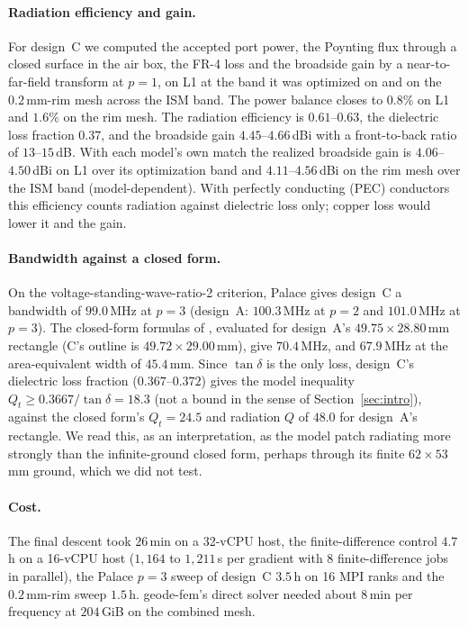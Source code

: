 \documentclass{anvil-paper}
\begin{document}
\paragraph{Radiation efficiency and gain.}
For design~C we computed the accepted port power, the Poynting flux through
a closed surface in the air box, the FR-4 loss and the broadside gain by a
near-to-far-field transform at $p = 1$, on L1 at the band it was optimized
on and on the $0.2$\,mm-rim mesh across the ISM band. The power balance
closes to $0.8\%$ on L1 and $1.6\%$ on the rim mesh. The radiation
efficiency is $0.61$--$0.63$, the dielectric loss fraction $0.37$, and the
broadside gain $4.45$--$4.66$\,dBi with a front-to-back ratio of
$13$--$15$\,dB. With each model's own match the realized broadside gain is
$4.06$--$4.50$\,dBi on L1 over its optimization band and $4.11$--$4.56$\,dBi
on the rim mesh over the ISM band (model-dependent). With perfectly
conducting (PEC) conductors this efficiency counts radiation against dielectric loss only;
copper loss would lower it and the gain.

\paragraph{Bandwidth against a closed form.}
On the voltage-standing-wave-ratio-2 criterion, Palace gives design~C a
bandwidth of $99.0$\,MHz at $p = 3$ (design~A: $100.3$\,MHz at $p = 2$ and
$101.0$\,MHz at $p = 3$). The closed-form formulas of
\citet{jackson1991simple}, evaluated for design~A's $49.75\times28.80$\,mm
rectangle (C's outline is $49.72\times29.00$\,mm), give $70.4$\,MHz, and
$67.9$\,MHz at the area-equivalent width of $45.4$\,mm. Since $\tan\delta$ is
the only loss, design~C's dielectric loss fraction ($0.367$--$0.372$) gives the
model inequality $Q_t \ge 0.3667/\tan\delta = 18.3$ (not a bound in the sense of
Section~\ref{sec:intro}), against the closed form's $Q_t = 24.5$ and radiation
$Q$ of $48.0$ for design~A's rectangle. We read this, as an interpretation, as
the model patch radiating more strongly than the infinite-ground closed form,
perhaps through its finite $62\times53$\,mm ground, which we did not test.

\paragraph{Cost.}
The final descent took $26$\,min on a 32-vCPU host, the finite-difference
control $4.7$\,h on a 16-vCPU host ($1{,}164$ to $1{,}211$\,s per gradient with 8
finite-difference jobs in parallel), the Palace $p = 3$ sweep of design~C $3.5$\,h on 16 MPI ranks and
the $0.2$\,mm-rim sweep $1.5$\,h. geode-fem's direct solver needed about
$8$\,min per frequency at $204$\,GiB on the combined mesh.
\end{document}
